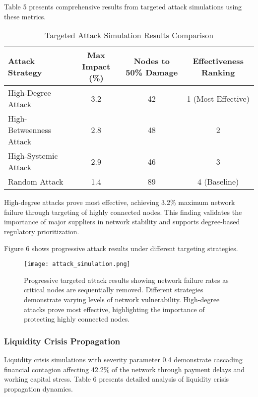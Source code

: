 \documentclass[a4 paper, 11pt,twoside]{article}
\newcommand{\0}{\Bf{0}}
\theoremstyle{definition}
\begin{document}
Table 5 presents comprehensive results from targeted attack simulations using these metrics.

\begin{table}[H]
\centering
\caption{Targeted Attack Simulation Results Comparison}
\begin{tabular}{@{}lccc@{}}
\toprule
\textbf{Attack Strategy} & \textbf{Max Impact (\%)} & \textbf{Nodes to 50\% Damage} & \textbf{Effectiveness Ranking} \\
\midrule
High-Degree Attack & 3.2 & 42 & 1 (Most Effective) \\
High-Betweenness Attack & 2.8 & 48 & 2 \\
High-Systemic Attack & 2.9 & 46 & 3 \\
Random Attack & 1.4 & 89 & 4 (Baseline) \\
\bottomrule
\end{tabular}
\end{table}

High-degree attacks prove most effective, achieving 3.2\% maximum network failure through targeting of highly connected nodes. This finding validates the importance of major suppliers in network stability and supports degree-based regulatory prioritization.

Figure 6 shows progressive attack results under different targeting strategies.

\begin{figure}[H]
\centering
\texttt{[image: attack\_simulation.png]}
\caption{Progressive targeted attack results showing network failure rates as critical nodes are sequentially removed. Different strategies demonstrate varying levels of network vulnerability. High-degree attacks prove most effective, highlighting the importance of protecting highly connected nodes.}
\end{figure}

\subsubsection{Liquidity Crisis Propagation}

Liquidity crisis simulations with severity parameter 0.4 demonstrate cascading financial contagion affecting 42.2\% of the network through payment delays and working capital stress. Table 6 presents detailed analysis of liquidity crisis propagation dynamics.
\end{document}
